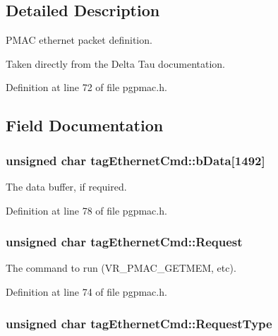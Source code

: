 \subsection{Detailed Description}
P\-M\-A\-C ethernet packet definition. 

Taken directly from the Delta Tau documentation. 

Definition at line 72 of file pgpmac.\-h.



\subsection{Field Documentation}
\hypertarget{structtagEthernetCmd_a872dab798127d6f589974a79c5d0aef1}{
\subsubsection[{b\-Data}]{\setlength{\rightskip}{0pt plus 5cm}unsigned char tag\-Ethernet\-Cmd\-::b\-Data\mbox{[}1492\mbox{]}}}\label{structtagEthernetCmd_a872dab798127d6f589974a79c5d0aef1}


The data buffer, if required. 



Definition at line 78 of file pgpmac.\-h.

\hypertarget{structtagEthernetCmd_a0dc566e7edbb226f1a4ea443d93d56e2}{
\subsubsection[{Request}]{\setlength{\rightskip}{0pt plus 5cm}unsigned char tag\-Ethernet\-Cmd\-::\-Request}}\label{structtagEthernetCmd_a0dc566e7edbb226f1a4ea443d93d56e2}


The command to run (V\-R\-\_\-\-P\-M\-A\-C\-\_\-\-G\-E\-T\-M\-E\-M, etc). 



Definition at line 74 of file pgpmac.\-h.

\hypertarget{structtagEthernetCmd_a6a155eb3ae546dd29369c4a33ddb3310}{
\subsubsection[{Request\-Type}]{\setlength{\rightskip}{0pt plus 5cm}unsigned char tag\-Ethernet\-Cmd\-::\-Request\-Type}}\label{structtagEthernetCmd_a6a155eb3ae546dd29369c4a33ddb3310}


